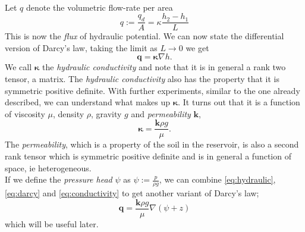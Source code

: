 \documentclass[../Main/main.tex]{subfiles}
\begin{document}
\\
Let $q$ denote the volumetric flow-rate per area
\begin{equation*}
q := \frac{q_d}{A} = \kappa \frac{h_2-h_1}{L}
\end{equation*}
This is now the \emph{flux} of hydraulic potential. We can now state the differential version of Darcy's law, taking the limit as $L\rightarrow 0$ we get 
\begin{equation}\label{eq:darcy}
\bm{q} = \bm{\kappa} \nabla h.
\end{equation}
We call $\bm{\kappa}$ the \emph{hydraulic conductivity} and note that it is in general a rank two tensor, a matrix. The \emph{hydraulic conductivity} also has the property that it is symmetric positive definite. 
With further experiments, similar to the one already described, we can understand what makes up $\bm{\kappa}$. It turns out that it is  a function of viscosity $\mu$, density $\rho$, gravity $g$ and \emph{permeability} $\bm{k}$,
\begin{equation} \label{eq:conductivity}
\bm{\kappa} = \frac{\bm{k} \rho g}{\mu}.
\end{equation}
The \emph{permeability}, which is a property of the soil in the reservoir, is also a second rank tensor which is symmetric positive definite and is in general a function of space, ie heterogeneous. \\
If we define the \emph{pressure head} $\psi$ as $\psi := \frac{p}{\rho g}$, we can combine \eqref{eq:hydraulic}, \eqref{eq:darcy} and \eqref{eq:conductivity} to get another variant of Darcy's law;
\begin{equation}\label{eq:darcyv2}
\bm{q} = \frac{\bm{k}\rho g}{\mu}\nabla(\psi + z)
\end{equation}
 which will be useful later.
\end{document}
